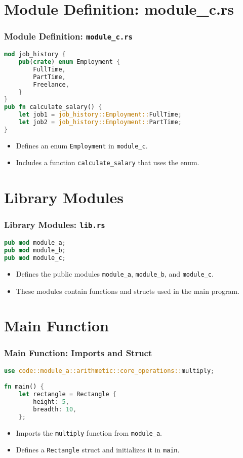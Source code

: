 \documentclass[aspectratio=169, table]{beamer}
\begin{document}
\section{Module Definition: module\_c.rs}
\begin{frame}[fragile]
\frametitle{Module Definition: \texttt{module\_c.rs}}
\begin{lstlisting}[language=Rust]
mod job_history {
	pub(crate) enum Employment {
		FullTime,
		PartTime,
		Freelance,
	}
}
pub fn calculate_salary() {
	let job1 = job_history::Employment::FullTime;
	let job2 = job_history::Employment::PartTime;
}
\end{lstlisting}
\begin{itemize}
\item Defines an enum \texttt{Employment} in \texttt{module\_c}.
\item Includes a function \texttt{calculate\_salary} that uses the enum.
\end{itemize}
\end{frame}

\section{Library Modules}
\begin{frame}[fragile]
\frametitle{Library Modules: \texttt{lib.rs}}
\begin{lstlisting}[language=Rust]
pub mod module_a;
pub mod module_b;
pub mod module_c;
\end{lstlisting}
\begin{itemize}
\item Defines the public modules \texttt{module\_a}, \texttt{module\_b}, and \texttt{module\_c}.
\item These modules contain functions and structs used in the main program.
\end{itemize}
\end{frame}

\section{Main Function}

\begin{frame}[fragile]
\frametitle{Main Function: Imports and Struct}
\begin{lstlisting}[language=Rust]
use code::module_a::arithmetic::core_operations::multiply;

fn main() {
	let rectangle = Rectangle {
		height: 5,
		breadth: 10,
	};
\end{lstlisting}
\begin{itemize}
	\item Imports the \texttt{multiply} function from \texttt{module\_a}.
	\item Defines a \texttt{Rectangle} struct and initializes it in \texttt{main}.
\end{itemize}
\end{frame}
\end{document}
